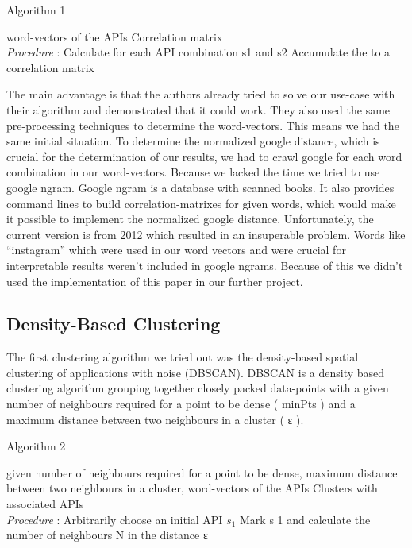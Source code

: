 \documentclass[a4paper]{IEEEtran}
\begin{document}
\begin{algorithm}[H]
 \caption{Algorithm 1}
 \begin{algorithmic}[1]
\renewcommand{\algorithmicrequire}{\textbf{Input:}}
 \renewcommand{\algorithmicensure}{\textbf{Output:}}
 \REQUIRE word-vectors of the APIs
 \ENSURE  Correlation matrix
 \\ \textit{Procedure} :
  \STATE Calculate for each API combination s1 and s2
 \STATE Accumulate the to a correlation matrix
 \end{algorithmic}
 \end{algorithm}

The main advantage is that the authors already tried to solve our use-case with their algorithm and demonstrated that it could work. They also used the same pre-processing techniques to determine the word-vectors. This means we had the same initial situation.
To determine the normalized google distance, which is crucial for the determination of our results, we had to crawl google for each word combination in our word-vectors. Because we lacked the time we tried to use google ngram. Google ngram is a database with scanned books. It also provides command lines to build correlation-matrixes for given words, which would make it possible to implement the normalized google distance. Unfortunately, the current version is from 2012 which resulted in an insuperable problem. Words like “instagram” which were used in our word vectors and were crucial for interpretable results weren’t included in google ngrams. Because of this we didn’t used the implementation of this paper in our further project.

\subsection{Density-Based Clustering}
The first clustering algorithm we tried out was the density-based spatial clustering of applications with noise (DBSCAN). DBSCAN is a density based clustering algorithm grouping together closely packed data-points with a given number of neighbours required for a point to be dense ( minPts ) and a maximum distance between two neighbours in a cluster ( ε ). 

\begin{algorithm}[H]
 \caption{Algorithm 2}
 \begin{algorithmic}[1]
\renewcommand{\algorithmicrequire}{\textbf{Input:}}
 \renewcommand{\algorithmicensure}{\textbf{Output:}}
 \REQUIRE given number of neighbours required for a point to be dense, maximum distance between two
neighbours in a cluster, word-vectors of the APIs
 \ENSURE  Clusters with associated APIs
 \\ \textit{Procedure} :
  \STATE Arbitrarily choose an initial API $s_1$
 \STATE Mark s 1 and calculate the number of neighbours N in the distance ε
 \end{algorithmic}
 \end{algorithm}
\end{document}
